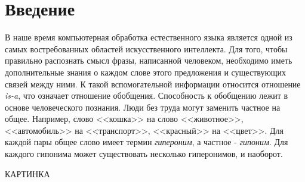 \section*{Введение}
\label{sec:Introduction} 
\large 

В наше время компьютерная обработка естественного языка является одной из самых
востребованных областей искусственного интеллекта. Для того, чтобы правильно
распознать смысл фразы, написанной человеком, необходимо иметь дополнительные
знания о каждом слове этого предложения и существующих связей между ними. К такой
вспомогательной информации относится отношение \textit{is-a}, что означает отношение
обобщения.
Способность к обобщению лежит в основе человеческого познания. Люди без труда могут
заменить частное на общее. Например, слово <<кошка>> на слово <<животное>>,
<<автомобиль>> на <<транспорт>>, <<красный>> на <<цвет>>. Для каждой пары общее слово имеет
термин \textit{гипероним}, а частное - \textit{гипоним}. Для каждого гипонима может существовать
несколько гиперонимов, и наоборот.


КАРТИНКА



